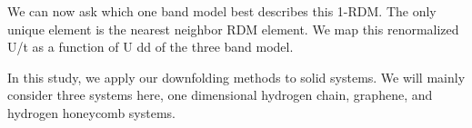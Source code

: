 \documentclass[prl,12pt,onecolumn,nofootinbib,notitlepage,english,superscriptaddress]{revtex4-1}
\newcommand{\HJC}[1]{{\color{RED}{\bf HJC: #1}}}
\begin{document}
\HJC{Explain several trends. Effective U/t . Effective t. Energy 3band vs energy 1 band}
\HJC{Transferability??}

We  can  now  ask  which  one  band  model  best  describes
this 1-RDM. The only unique element is the nearest neighbor
RDM element.  We map this renormalized
U/t
as a function
of
U dd
of the three band model.

%
\HJC{Concepts have been defined... Now move on to ab initio}
In this study, we apply our downfolding methods to solid systems. We will mainly consider three systems here, one dimensional hydrogen chain, graphene, and hydrogen honeycomb systems. 
\end{document}
